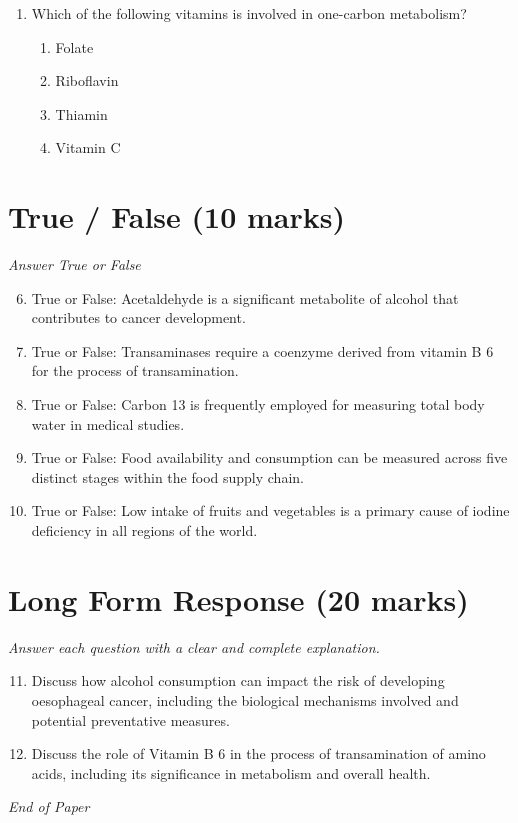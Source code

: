 \documentclass[12pt]{article}
\begin{document}
\begin{enumerate}[label=\arabic*.]
\begin{enumerate}[label=(\alph*)]
    \item 2 hour post prandial glucose \ensuremath{\geq} to 126 mg/dl
    \item fasting blood glucose \ensuremath{\geq} 126 mg/dl
\end{enumerate}
\item Which of the following vitamins is involved in one-carbon metabolism?
\begin{enumerate}[label=(\alph*)]
    \item Folate
    \item Riboflavin
    \item Thiamin
    \item Vitamin C
\end{enumerate}
\end{enumerate}

\section*{True / False (10 marks)}
\textit{Answer True or False}
\begin{enumerate}[label=\arabic*.]
\setcounter{enumi}{5}
\item True or False: Acetaldehyde is a significant metabolite of alcohol that contributes to cancer development.
\item True or False: Transaminases require a coenzyme derived from vitamin B 6 for the process of transamination.
\item True or False: Carbon 13 is frequently employed for measuring total body water in medical studies.
\item True or False: Food availability and consumption can be measured across five distinct stages within the food supply chain.
\item True or False: Low intake of fruits and vegetables is a primary cause of iodine deficiency in all regions of the world.
\end{enumerate}

\section*{Long Form Response (20 marks)}
\textit{Answer each question with a clear and complete explanation.}
\begin{enumerate}[label=\arabic*.]
\setcounter{enumi}{10}
\item Discuss how alcohol consumption can impact the risk of developing oesophageal cancer, including the biological mechanisms involved and potential preventative measures.
\item Discuss the role of Vitamin B 6 in the process of transamination of amino acids, including its significance in metabolism and overall health.
\end{enumerate}

\vfill
\noindent\textit{End of Paper}
\end{document}
